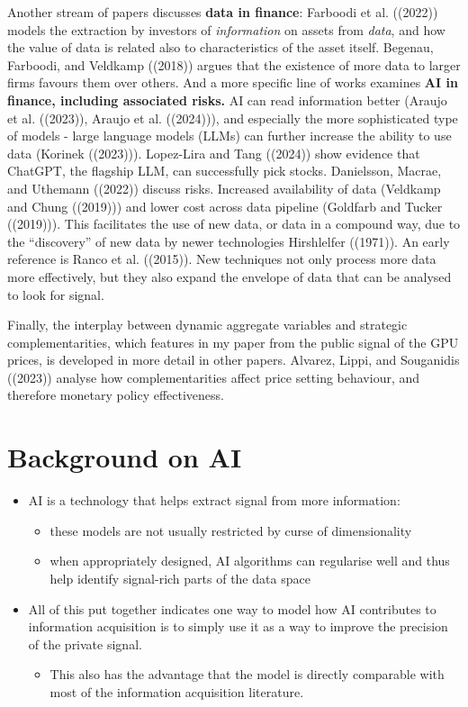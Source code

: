 \documentclass[
]{article}
\providecommand{\tightlist}{%
  \setlength{\itemsep}{0pt}\setlength{\parskip}{0pt}}\usepackage{longtable,booktabs,array}
\theoremstyle{plain}
\theoremstyle{definition}
\theoremstyle{remark}
\begin{document}
Another stream of papers discusses \textbf{data in finance}: Farboodi et
al. ((2022)) models the extraction by investors of \emph{information} on
assets from \emph{data}, and how the value of data is related also to
characteristics of the asset itself. Begenau, Farboodi, and Veldkamp
((2018)) argues that the existence of more data to larger firms favours
them over others. And a more specific line of works examines \textbf{AI
in finance, including associated risks.} AI can read information better
(Araujo et al. ((2023)), Araujo et al. ((2024))), and especially the
more sophisticated type of models - large language models (LLMs) can
further increase the ability to use data (Korinek ((2023))). Lopez-Lira
and Tang ((2024)) show evidence that ChatGPT, the flagship LLM, can
successfully pick stocks. Danielsson, Macrae, and Uthemann ((2022))
discuss risks. Increased availability of data (Veldkamp and Chung
((2019))) and lower cost across data pipeline (Goldfarb and Tucker
((2019))). This facilitates the use of new data, or data in a compound
way, due to the ``discovery'' of new data by newer technologies
Hirshlelfer ((1971)). An early reference is Ranco et al. ((2015)). New
techniques not only process more data more effectively, but they also
expand the envelope of data that can be analysed to look for signal.

Finally, the interplay between dynamic aggregate variables and strategic
complementarities, which features in my paper from the public signal of
the GPU prices, is developed in more detail in other papers. Alvarez,
Lippi, and Souganidis ((2023)) analyse how complementarities affect
price setting behaviour, and therefore monetary policy effectiveness.

\hypertarget{background-on-ai}{%
\section{Background on AI}\label{background-on-ai}}

\begin{itemize}
\tightlist
\item
  AI is a technology that helps extract signal from more information:

  \begin{itemize}
  \tightlist
  \item
    these models are not usually restricted by curse of dimensionality
  \item
    when appropriately designed, AI algorithms can regularise well and
    thus help identify signal-rich parts of the data space
  \end{itemize}
\item
  All of this put together indicates one way to model how AI contributes
  to information acquisition is to simply use it as a way to improve the
  precision of the private signal.

  \begin{itemize}
  \tightlist
  \item
    This also has the advantage that the model is directly comparable
    with most of the information acquisition literature.
  \end{itemize}
\end{itemize}
\end{document}
